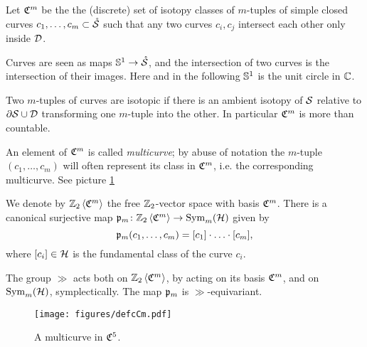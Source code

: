 \begin{defn}
\label{defn:cCm}
Let $\cC^m$ be the the (discrete) set of isotopy classes of $m$-tuples of simple closed curves $c_1,\dots,c_m\subset\mrS$
such that
 any two curves $c_i,c_j$ intersect each other only inside $\D$.
 
Curves are seen as maps $\Sone\to\mrS$, and the intersection of two curves is the intersection of their
images. Here and in the following $\Sone$ is the unit circle in $\C$.

Two $m$-tuples of curves are isotopic if there is an ambient isotopy of $\S$ relative to $\partial\S\cup\D$
transforming one $m$-tuple into the other. In particular $\cC^m$ is more than countable.

An element of $\cC^m$ is called \emph{multicurve}; by abuse of notation the $m$-tuple
$(c_1,\dots,c_m)$ will often represent its class in $\cC^m$, i.e. the corresponding multicurve.
See picture \ref{fig:defcCm}

We denote by $\ZcC{m}$ the free $\Z_2$-vector space with basis $\cC^m$.
There is a canonical surjective map $\pr_m\colon\ZcC{m}\to\Sym_m(\H)$ given by
\[
 \pr_m(c_1,\dots,c_m)=[c_1]\cdot\ldots\cdot[c_m],
\]
where $[c_i]\in\H$ is the fundamental class of the curve $c_i$.

The group $\gg$ acts both on $\ZcC{m}$, by acting on its basis $\cC^m$, and
on $\Sym_m(\H)$, symplectically. The map $\pr_m$ is $\gg$-equivariant.
\end{defn}

\begin{figure}\centering
 \texttt{[image: figures/defcCm.pdf]}
 \caption{A multicurve in $\cC^5$.}
\label{fig:defcCm}
\end{figure}


